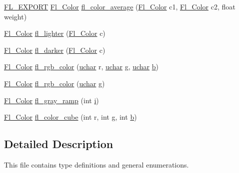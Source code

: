 \begin{DoxyCompactItemize}
\hyperlink{_fl___export_8_h_aa9ba29a18aee9d738370a06eeb4470fc}{F\+L\+\_\+\+E\+X\+P\+O\+RT} \hyperlink{_enumerations_8_h_a8b762953646f8abee866061f1af78a6a}{Fl\+\_\+\+Color} \hyperlink{_enumerations_8_h_ae421f6f475053ece0a0dd80e9198ac07}{fl\+\_\+color\+\_\+average} (\hyperlink{_enumerations_8_h_a8b762953646f8abee866061f1af78a6a}{Fl\+\_\+\+Color} c1, \hyperlink{_enumerations_8_h_a8b762953646f8abee866061f1af78a6a}{Fl\+\_\+\+Color} c2, float weight)
\item 
\hyperlink{_enumerations_8_h_a8b762953646f8abee866061f1af78a6a}{Fl\+\_\+\+Color} \hyperlink{_enumerations_8_h_affef7da8b67f0b735d5dcb9ebe60e17d}{fl\+\_\+lighter} (\hyperlink{_enumerations_8_h_a8b762953646f8abee866061f1af78a6a}{Fl\+\_\+\+Color} c)
\item 
\hyperlink{_enumerations_8_h_a8b762953646f8abee866061f1af78a6a}{Fl\+\_\+\+Color} \hyperlink{_enumerations_8_h_a88fd2733842cb5d287650bcf160f2531}{fl\+\_\+darker} (\hyperlink{_enumerations_8_h_a8b762953646f8abee866061f1af78a6a}{Fl\+\_\+\+Color} c)
\item 
\hyperlink{_enumerations_8_h_a8b762953646f8abee866061f1af78a6a}{Fl\+\_\+\+Color} \hyperlink{_enumerations_8_h_a7c5acc4633fbab7016bce2fb69046494}{fl\+\_\+rgb\+\_\+color} (\hyperlink{fl__types_8h_a65f85814a8290f9797005d3b28e7e5fc}{uchar} r, \hyperlink{fl__types_8h_a65f85814a8290f9797005d3b28e7e5fc}{uchar} g, \hyperlink{fl__types_8h_a65f85814a8290f9797005d3b28e7e5fc}{uchar} \hyperlink{forms_8_h_a0ba06a290a384fa06b1b90745827dae2}{b})
\item 
\hyperlink{_enumerations_8_h_a8b762953646f8abee866061f1af78a6a}{Fl\+\_\+\+Color} \hyperlink{_enumerations_8_h_af26a6486e65decd723fbe5c1f43deb0b}{fl\+\_\+rgb\+\_\+color} (\hyperlink{fl__types_8h_a65f85814a8290f9797005d3b28e7e5fc}{uchar} g)
\item 
\hyperlink{_enumerations_8_h_a8b762953646f8abee866061f1af78a6a}{Fl\+\_\+\+Color} \hyperlink{_enumerations_8_h_a6045423248a367d4d3885109f18e0bd9}{fl\+\_\+gray\+\_\+ramp} (int \hyperlink{forms_8_h_acb559820d9ca11295b4500f179ef6392}{i})
\item 
\hyperlink{_enumerations_8_h_a8b762953646f8abee866061f1af78a6a}{Fl\+\_\+\+Color} \hyperlink{_enumerations_8_h_a2f613709d1c9444f9f03e7c0349223f3}{fl\+\_\+color\+\_\+cube} (int r, int g, int \hyperlink{forms_8_h_a0ba06a290a384fa06b1b90745827dae2}{b})
\end{DoxyCompactItemize}


\subsection{Detailed Description}
This file contains type definitions and general enumerations. 

